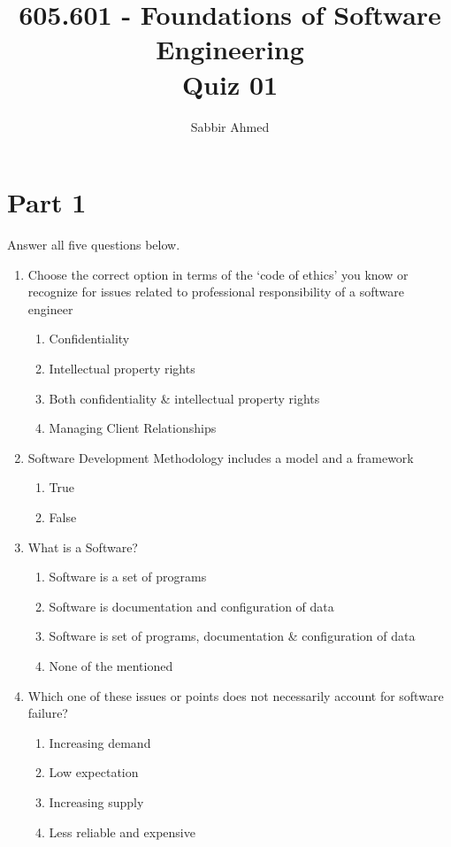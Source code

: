 \documentclass{article}
\newcommand{\answeritem}{\global\answertrue\item}
\newcommand{\perhapsanswer}{%
  \ifanswer
    $\blacksquare$ \global\answerfalse
  \else
    $\square$ \global\answerfalse
  \fi
}
\newif\ifanswer
\begin{document}
  \title{605.601 - Foundations of Software Engineering \\ Quiz 01}
  \author{Sabbir Ahmed}

  \maketitle

  \section*{Part 1} Answer all five questions below.

  \begin{enumerate}

    \item Choose the correct option in terms of the ‘code of ethics’ you know or recognize for issues related to professional responsibility of a software engineer
    \begin{enumerate}[start=1,align=left,label={\protect\perhapsanswer(\alph*)}]
      \item Confidentiality
      \item Intellectual property rights
      \answeritem Both confidentiality \& intellectual property rights
      \item Managing Client Relationships
    \end{enumerate}

    \item Software Development Methodology includes a model and a framework
    \begin{enumerate}[start=1,align=left,label={\protect\perhapsanswer(\alph*)}]
      \answeritem True
      \item False
    \end{enumerate}

    \item What is a Software?
    \begin{enumerate}[start=1,align=left,label={\protect\perhapsanswer(\alph*)}]
      \item Software is a set of programs
      \item Software is documentation and configuration of data
      \answeritem Software is set of programs, documentation \& configuration of data
      \item None of the mentioned
    \end{enumerate}

    \item Which one of these issues or points does not necessarily account for software failure?
    \begin{enumerate}[start=1,align=left,label={\protect\perhapsanswer(\alph*)}]
      \item Increasing demand
      \answeritem Low expectation
      \item Increasing supply
      \item Less reliable and expensive
    \end{enumerate}


\end{enumerate}
\end{document}
